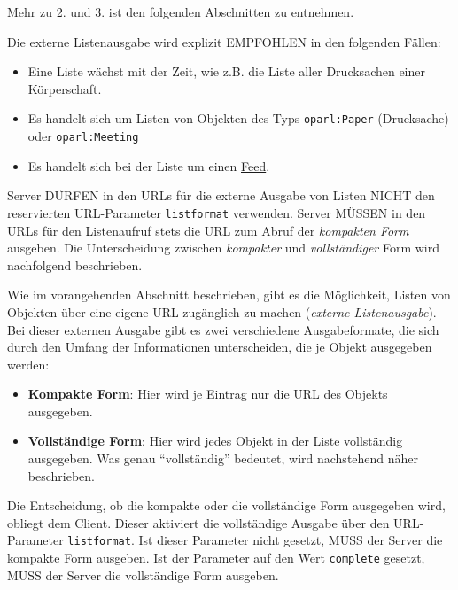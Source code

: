 \documentclass[,a4paper]{article}
\begin{document}
Mehr zu 2. und 3. ist den folgenden Abschnitten zu entnehmen.

Die externe Listenausgabe wird explizit EMPFOHLEN in den folgenden
Fällen:

\begin{itemize}
\item
  Eine Liste wächst mit der Zeit, wie z.B. die Liste aller Drucksachen
  einer Körperschaft.
\item
  Es handelt sich um Listen von Objekten des Typs \texttt{oparl:Paper}
  (Drucksache) oder \texttt{oparl:Meeting}
\item
  Es handelt sich bei der Liste um einen \hyperref[feeds]{Feed}.
\end{itemize}

Server DÜRFEN in den URLs für die externe Ausgabe von Listen NICHT den
reservierten URL-Parameter \texttt{listformat} verwenden. Server MÜSSEN
in den URLs für den Listenaufruf stets die URL zum Abruf der
\emph{kompakten Form} ausgeben. Die Unterscheidung zwischen
\emph{kompakter} und \emph{vollständiger} Form wird nachfolgend
beschrieben.


Wie im vorangehenden Abschnitt beschrieben, gibt es die Möglichkeit,
Listen von Objekten über eine eigene URL zugänglich zu machen
(\emph{externe Listenausgabe}). Bei dieser externen Ausgabe gibt es zwei
verschiedene Ausgabeformate, die sich durch den Umfang der Informationen
unterscheiden, die je Objekt ausgegeben werden:

\begin{itemize}
\item
  \textbf{Kompakte Form}: Hier wird je Eintrag nur die URL des Objekts
  ausgegeben.
\item
  \textbf{Vollständige Form}: Hier wird jedes Objekt in der Liste
  vollständig ausgegeben. Was genau ``vollständig'' bedeutet, wird
  nachstehend näher beschrieben.
\end{itemize}

Die Entscheidung, ob die kompakte oder die vollständige Form ausgegeben
wird, obliegt dem Client. Dieser aktiviert die vollständige Ausgabe über
den URL-Parameter \texttt{listformat}. Ist dieser Parameter nicht
gesetzt, MUSS der Server die kompakte Form ausgeben. Ist der Parameter
auf den Wert \texttt{complete} gesetzt, MUSS der Server die vollständige
Form ausgeben.
\end{document}
